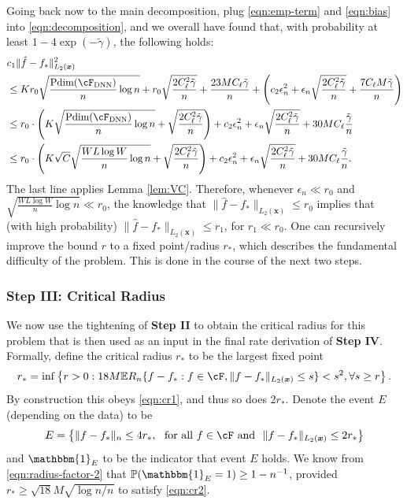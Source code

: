 \documentclass[11pt]{article}
\numberwithin{equation}{section}
\theoremstyle{definition}
\newcommand{\E}{\mathbb{E}}
\renewcommand{\P}{\mathbb{P}}
\newcommand{\One}{\mathbbm{1}}
\newcommand{\bx}{\bm{x}}
\newcommand{\gt}{\tilde{\gamma}}
\begin{document}
\begin{appendices}
Going back now to the main decomposition, plug \eqref{eqn:emp-term} and \eqref{eqn:bias} into \eqref{eqn:decomposition}, and we overall have found that, with probability at least $1- 4\exp(-\gt)$, the following holds:
\begin{align}
	& c_1 \| \hat{f} - f_* \|_{L_2(\bx)}^2  		 \nonumber \\
	& \leq K r_0  \sqrt{ \frac{{\rm Pdim}(\cF_{\rm DNN})}{n} \log n} + r_0 \sqrt{\frac{2 C_\ell^2 \gt}{n}} + \frac{23 M C_\ell \gt}{n} + \left( c_2 \epsilon_n^2 + \epsilon_n \sqrt{\frac{ 2C_\ell^2 \gt }{n}} + \frac{7 C_\ell M \gt}{n} \right)   		\nonumber \\
	& \leq r_0 \cdot   \left( K\sqrt{ \frac{{\rm Pdim}(\cF_{\rm DNN})}{n} \log n} + \sqrt{\frac{2 C_\ell^2 \gt}{n}} \right) + c_2 \epsilon_n^2 + \epsilon_n \sqrt{\frac{2C_\ell^2 \gt }{n}}   + 30 M C_\ell \frac{\gt}{n}   		\nonumber \\
	& \leq r_0 \cdot \left( K\sqrt{C} \sqrt{ \frac{W L \log W}{n}\log n}  + \sqrt{\frac{2 C_\ell^2 \gt}{n}} \right) + c_2 \epsilon_n^2 + \epsilon_n \sqrt{\frac{2C_\ell^2 \gt }{n}}   + 30 M C_\ell \frac{\gt}{n}.  		\label{eqn:one-step}
\end{align}
The last line applies Lemma \ref{lem:VC}. Therefore, whenever $\epsilon_n \ll r_0$ and $ \sqrt{ \frac{W L \log W}{n}\log n} \ll r_0$, the knowledge that $\|\hat{f} - f_*\|_{L_2(\bx)} \leq r_0$ implies that (with high probability) $\| \hat{f} - f_* \|_{L_2(\bx)} \leq r_1$, for $r_1 \ll r_0$. One can recursively improve the bound $r$ to a fixed point/radius $r_*$, which describes the fundamental difficulty of the problem. This is done in the course of the next two steps.






\subsubsection{Step III: Critical Radius} 
	\label{appx:radius}

We now use the tightening of {\bf Step II} to obtain the critical radius for this problem that is then used as an input in the final rate derivation of {\bf Step IV}. Formally, define the critical radius $r_*$ to be the largest fixed point 
\[
	r_* = \inf \left\{ r>0 : 18 M \E R_n \{ f - f_*: f \in \cF, \|f - f_* \|_{L_2(\bx)} \leq s \} < s^2, \forall s \geq r \right\}.
\]
By construction this obeys \eqref{eqn:cr1}, and thus so does $2r_*$. Denote the event $E$ (depending on the data) to be 
\begin{align*}
	E = \left\{ \|f - f_* \|_n \leq 4r_*,~~\text{for all $f \in \cF$ and}~~ \|f - f_* \|_{L_2(\bx)} \leq 2r_* \right\}
\end{align*}
and $\One_E$ to be the indicator that event $E$ holds. We know from \eqref{eqn:radius-factor-2} that $\P(\One_E=1) \geq 1 - n^{-1}$, provided $r_* \geq \sqrt{18}M\sqrt{\log n/n}$ to satisfy \eqref{eqn:cr2}.


\end{appendices}
\end{document}
